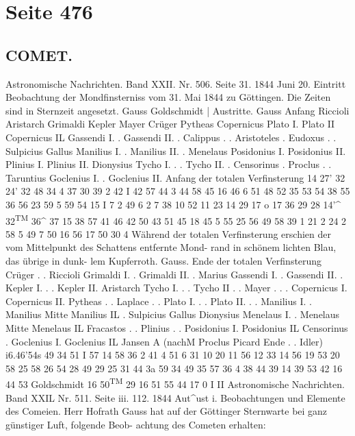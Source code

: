 \documentclass[10pt,a4paper]{article}
\begin{document}
\newpage
\section*{Seite 476}

\subsection*{COMET.}

Astronomische  Nachrichten.     Band  XXII.  Nr.  506.  Seite  31.     1844  Juni  20.
Eintritt
Beobachtung  der  Mondfinsterniss  vom  31.  Mai  1844  zu  Göttingen.
Die  Zeiten  sind  in  Sternzeit  angesetzt.
Gauss  Goldschmidt    |  Austritte.  Gauss
Anfang
Riccioli
Aristarch
Grimaldi
Kepler
Mayer
Crüger
Pytheas
Copernicus
Plato  I.
Plato  II
Copernicus  IL
Gassendi  I.    .
Gassendi  II.  .
Calippus   .     .
Aristoteles     .
Eudoxus   .     .
Sulpicius  Gallus
Manilius  I.    .
Manilius  II.  .
Menelaus
Posidonius  I.
Posidonius  II.
Plinius  I.
Plinius  II.
Dionysius
Tycho  I.  .     .
Tycho  II.       .
Censorinus     .
Proclus     .     .
Taruntius
Goclenius  I.  .
Goclenius  II.
Anfang  der  totalen
Verfinsterung
14\glqq{}  27'\glqq{}
32  24'
32  48
34  4
37  30
39  2
42  I
42  57
44  3
44  58
45  16
46  6
51  48
52  35
53  \glqq{}
54  38
55  36
56  23
59  5
59  54
15   I  7
2  49
6  2
7  38
10  52
11  23
14  29
17  o
17  36
29  28
14'\textasciicircum{}  32\textsuperscript{TM}  36\textasciicircum{}
37  15
38  57
41  46
42  50
43  51
45  18
45  5
55  25
56  49
58  39
1  21
2  24
2  58
5  49
7  50
16  56
17  50
30   4
Während  der  totalen  Verfinsterung  erschien
der  vom  Mittelpunkt  des  Schattens  entfernte  Mond-
rand in  schönem  lichten  Blau,  das  übrige  in  dunk-
lem Kupferroth.  Gauss.
Ende  der  totalen
Verfinsterung
Crüger       .     .
Riccioli
Grimaldi  I.    .
Grimaldi  II.  .
Marius
Gassendi  I.    .
Gassendi  II.  .
Kepler  I.  .     .
Kepler  II.
Aristarch
Tycho  I.   .     .
Tycho  II  .     .
Mayer .     .     .
Copernicus  I.
Copernicus  II.
Pytheas     .     .
Laplace     .     .
Plato  I.     .     .
Plato  II.  .     .
Manilius  I.    .
Manilius  Mitte
Manilius  IL  .
Sulpicius  Gallus
Dionysius
Menelaus  I.  .
Menelaus  Mitte
Menelaus  IL
Fracastos  .     .
Plinius      .     .
Posidonius  I.
Posidonius  IL
Censorinus     .
Goclenius  I.
Goclenius  IL
Jansen  A  (nachM
Proclus
Picard
Ende    .     .
Idler)
i6\glqq{}.\glqq{}46\glqq{}'54s
49  34
51   I
57  14
58  36
2  41
4  51
6  31
10  20
11  56
12  33
14  56
19  53
20  58
25  58
26  54
28  49
29  25
31  44
3a  59
34  49
35  57
36  4
38  44
39  14
39  53
42  16
44  53
Goldschmidt
16\glqq{}  50\textsuperscript{TM}  29
16  51
55 44
17   0
I
II
\textbullet{}
Astronomische  Nachrichten.     Band  XXIL  Nr.  511.  Seite  iii.  112.     1844  Aut\textasciicircum{}ust  i.
Beobachtungen  und  Elemente  des  Comeien.
Herr  Hofrath  Gauss  hat  auf  der  Göttinger  Sternwarte   bei   ganz  günstiger   Luft,   folgende  Beob-
achtung des  Cometen  erhalten:
\end{document}
